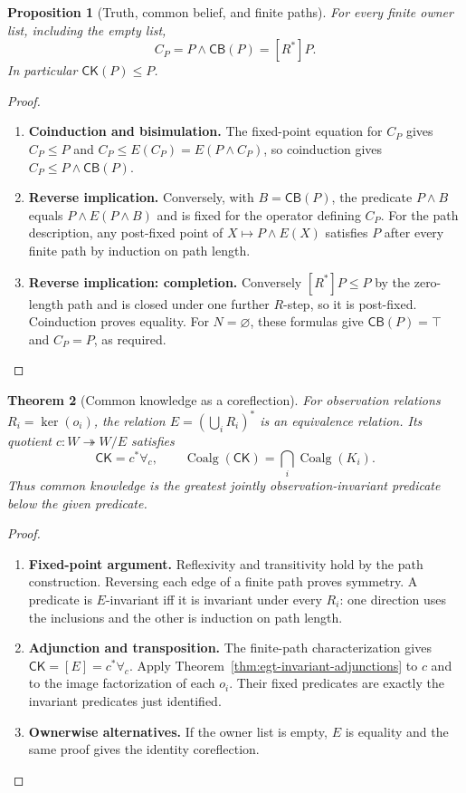 \documentclass[11pt,a4paper]{article}
\numberwithin{equation}{section}
\newtheorem{theorem}{Theorem}[section]
\newtheorem{proposition}[theorem]{Proposition}
\theoremstyle{definition}
\theoremstyle{remark}
\theoremstyle{plain}
\begin{document}
\begin{proposition}[Truth, common belief, and finite paths]
\label{prop:egt-true-common-belief}
For every finite owner list, including the empty list,
\[
 C_P=P\wedge\mathsf{CB}(P)=[R^*]P.
\]
In particular $\mathsf{CK}(P)\leq P$.
\end{proposition}
\begin{proof}
\leavevmode
\begin{enumerate}[label=\textup{(\arabic*)},leftmargin=*,itemsep=4pt,topsep=3pt]
  \item \textbf{Coinduction and bisimulation.} The fixed-point equation for $C_P$ gives $C_P\leq P$ and
$C_P\leq E(C_P)=E(P\wedge C_P)$, so coinduction gives
$C_P\leq P\wedge\mathsf{CB}(P)$.
  \item \textbf{Reverse implication.} Conversely, with
$B=\mathsf{CB}(P)$, the predicate $P\wedge B$ equals
$P\wedge E(P\wedge B)$ and is fixed for the operator defining $C_P$. For the path description, any post-fixed point of $X\mapsto P\wedge E(X)$
satisfies $P$ after every finite path by induction on path length.
  \item \textbf{Reverse implication: completion.} Conversely $[R^*]P\leq P$ by the zero-length path and is closed under
one further $R$-step, so it is post-fixed. Coinduction proves equality. For $N=\varnothing$, these formulas give
$\mathsf{CB}(P)=\top$ and $C_P=P$, as required.
\end{enumerate}
\end{proof}

\begin{theorem}[Common knowledge as a coreflection]
\label{thm:egt-common-coreflection}
For observation relations $R_i=\ker(o_i)$, the relation
$E=(\bigcup_iR_i)^*$ is an equivalence relation. Its quotient
$c:W\twoheadrightarrow W/E$ satisfies
\[
 \mathsf{CK}=c^*\forall_c,\qquad
 \operatorname{Coalg}(\mathsf{CK})
 =\bigcap_i\operatorname{Coalg}(K_i).
\]
Thus common knowledge is the greatest jointly observation-invariant
predicate below the given predicate.
\end{theorem}
\begin{proof}
\leavevmode
\begin{enumerate}[label=\textup{(\arabic*)},leftmargin=*,itemsep=4pt,topsep=3pt]
  \item \textbf{Fixed-point argument.} Reflexivity and transitivity hold by the path construction. Reversing each
edge of a finite path proves symmetry. A predicate is $E$-invariant iff
it is invariant under every $R_i$: one direction uses the inclusions and
the other is induction on path length.
  \item \textbf{Adjunction and transposition.} The finite-path characterization
gives $\mathsf{CK}=[E]=c^*\forall_c$. Apply
Theorem~\ref{thm:egt-invariant-adjunctions} to $c$ and to the image
factorization of each $o_i$. Their fixed predicates are exactly the
invariant predicates just identified.
  \item \textbf{Ownerwise alternatives.} If the owner list is empty, $E$ is
equality and the same proof gives the identity coreflection.
\end{enumerate}
\end{proof}
\end{document}
